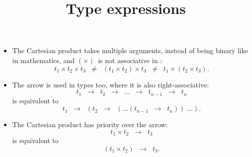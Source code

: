 \documentclass[wide]{slides}
\begin{document}
\begin{slide}
  \title{Type expressions}

  \begin{itemize}

    \item The Cartesian product takes multiple arguments, instead of
      being binary like in mathematics, and $(\times)$~is not
      associative in \OCaml:
      \begin{equation*}
        t_1 \times t_2 \times t_3 \;\; \neq \;\; (t_1 \times t_2) \times
        t_3 \;\; \neq \;\; t_1 \times (t_2 \times t_3).
      \end{equation*}

    \item The arrow is used in types too, where it is also
      right\hyp{}associative:
      \begin{equation*}
        t_1 \;\; \rightarrow \;\; t_2 \;\; \rightarrow \;\; \ldots
        \;\; \rightarrow \;\; t_{n-1} \;\; \rightarrow \;\; t_n
      \end{equation*}
      is equivalent to
      \begin{equation*}
        t_1 \;\; \rightarrow \;\; (t_2 \;\; \rightarrow \;\; (\ldots
        (t_{n-1} \;\; \rightarrow \;\; t_n)) \; \ldots).
      \end{equation*}

    \item The Cartesian product has priority over the arrow:
      \begin{equation*}
        t_1 \times t_2 \;\; \rightarrow \;\; t_3
      \end{equation*}
      is equivalent to
      \begin{equation*}
        (t_1 \times t_2) \;\; \rightarrow \;\; t_3.
      \end{equation*}

  \end{itemize}

\end{slide}
\end{document}
